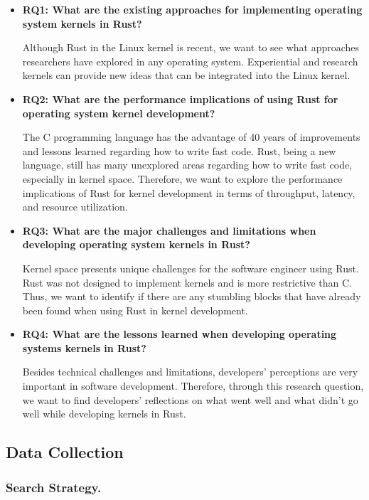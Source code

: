 \documentclass[sigconf]{acmart}
\begin{document}
\begin{itemize}
    \item \textbf{RQ1: What are the existing approaches for implementing operating system kernels in Rust?}
    
    Although Rust in the Linux kernel is recent, we want to see what approaches researchers have explored in any operating system. Experiential and research kernels can provide new ideas that can be integrated into the Linux kernel.
    \item \textbf{RQ2: What are the performance implications of using Rust for operating system kernel development?}

    The C programming language has the advantage of 40 years of improvements and lessons learned regarding how to write fast code. Rust, being a new language, still has many unexplored areas regarding how to write fast code, especially in kernel space. Therefore, we want to explore the performance implications of Rust for kernel development in terms of throughput, latency, and resource utilization.
    \item \textbf{RQ3: What are the major challenges and limitations when developing operating system kernels in Rust?}%

      Kernel space presents unique challenges for the software engineer using Rust. Rust was not designed to implement kernels and is more restrictive than C. Thus, we want to identify if there are any stumbling blocks that have already been found when using Rust in kernel development.
    \item \textbf{RQ4: What are the lessons learned when developing operating systems kernels in Rust?}

    Besides technical challenges and limitations, developers' perceptions are very important in software development. Therefore, through this research question, we want to find developers' reflections on what went well and what didn't go well while developing kernels in Rust.
\end{itemize}

\subsection{Data Collection}

\subsubsection{\textbf{Search Strategy.}}
\end{document}
